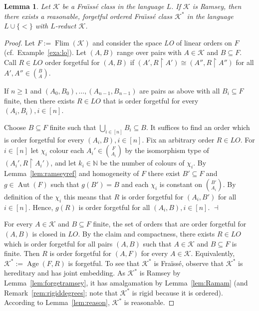 \documentclass[12pt]{amsart}
\theoremstyle{plain}
\newtheorem{lemma}[theorem]{Lemma}
\theoremstyle{definition}
\begin{document}
\begin{lemma}\label{lem:forget}
Let ${\mathcal K}$ be a Fra\"{\i}ss\'{e} class in the language $L$. If ${\mathcal K}$ is Ramsey, then there exists a 
reasonable, forgetful ordered Fra\"{\i}ss\'{e} class ${\mathcal K}^*$ in the language $L\cup \{<\}$ with $L$-reduct ${\mathcal K}$.
\end{lemma}
\begin{proof} Let $F:=\operatorname{Flim}({\mathcal K})$ and consider the space {\em LO} of linear orders on $F$ (cf.~Example~\ref{exa:lo}). 
Let $(A,B)$ range over pairs with $A\in{\mathcal K}$ and $B\subseteq F$.
Call $R\in\textit{LO}$ order forgetful for $(A,B)$ if 
$(A',R\upharpoonright A')\cong(A'',R\upharpoonright A'')$ for all $A',A''\in{B\choose A}$. 

\medskip

 If $n\ge 1$ and $(A_0,B_0), \ldots,(A_{n-1},B_{n-1})$ are pairs as above with all $B_i\subseteq F$ finite, 
then there exists $R\in\textit{LO}$ 
that is order forgetful for every $(A_i,B_i), i\in [n]$.
\medskip

 Choose $B\subseteq F$ finite 
such that $\bigcup_{i\in [n]}B_i\subseteq B$. It suffices to find
an order which is order forgetful for every $(A_i, B), i\in [n]$. Fix an arbitrary order $R\in\textit{LO}$. 
For $i\in [n]$ let $\chi_i$ colour each  $A_i'\in{F \choose A_i}$ by the isomorphism 
type of $(A_i',R\upharpoonright A_i')$, and let $k_i\in{\mathbb N}$ be the number of colours 
of $\chi_i$. 
By Lemma~\ref{lem:ramseyref} and homogeneity of $F$ there exist $B'\subseteq F$ and $g\in \operatorname{Aut}(F)$ such that 
$g(B')=B$ and each $\chi_i$ is constant on $\binom{B'}{A_i}$. 
By definition of the $\chi_i$ this means that $R$ is order 
forgetful for $(A_i, B')$ for all $i\in [n]$. Hence, $g(R)$ is order forgetful for all $(A_i, B), i\in [n]$.
\hfill$\dashv$\medskip

For every $A\in{\mathcal K}$ and $B\subseteq F$ finite, the set of orders that are order forgetful for $(A,B)$ is 
closed in $\textit{LO}$. By the claim and compactness, there exists $R\in\textit{LO}$ which is order forgetful 
for all pairs $(A,B)$ such that $A\in{\mathcal K}$ and $B\subseteq F$ is finite.
Then $R$ is order forgetful for $(A,F)$ for every $A\in{\mathcal K}$. Equivalently, ${\mathcal K}^*:=\operatorname{Age}(F,R)$ is forgetful. 
To see that ${\mathcal K}^*$ is Fra\"iss\'e, observe that ${\mathcal K}^*$ is hereditary and has joint embedding. As ${\mathcal K}^*$ is 
Ramsey by Lemma~\ref{lem:forgetramsey}, it has amalgamation by Lemma~\ref{lem:Ramam} (and Remark~\ref{rem:rigiddegrees}; 
note that ${\mathcal K}^*$ is rigid because it is ordered). According to Lemma~\ref{lem:reason}, ${\mathcal K}^*$ is reasonable.
\end{proof}
\end{document}
